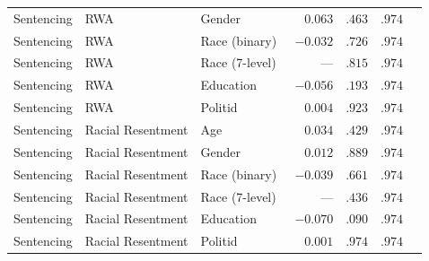 \begin{table}[!htbp]
\begin{tabular}{lllrrrl}
    Sentencing & RWA                & Gender         & $\phantom{-}0.063$ & $.463$ & $.974$ & \\
    Sentencing & RWA                & Race (binary)  & $-0.032$           & $.726$ & $.974$ & \\
    Sentencing & RWA                & Race (7-level) & ---                & $.815$ & $.974$ & \\
    Sentencing & RWA                & Education      & $-0.056$           & $.193$ & $.974$ & \\
    Sentencing & RWA                & Politid        & $\phantom{-}0.004$ & $.923$ & $.974$ & \\
    \addlinespace
    Sentencing & Racial Resentment  & Age            & $\phantom{-}0.034$ & $.429$ & $.974$ & \\
    Sentencing & Racial Resentment  & Gender         & $\phantom{-}0.012$ & $.889$ & $.974$ & \\
    Sentencing & Racial Resentment  & Race (binary)  & $-0.039$           & $.661$ & $.974$ & \\
    Sentencing & Racial Resentment  & Race (7-level) & ---                & $.436$ & $.974$ & \\
    Sentencing & Racial Resentment  & Education      & $-0.070$           & $.090$ & $.974$ & \\
    Sentencing & Racial Resentment  & Politid        & $\phantom{-}0.001$ & $.974$ & $.974$ & \\
    \bottomrule
  \end{tabular}
\end{table}